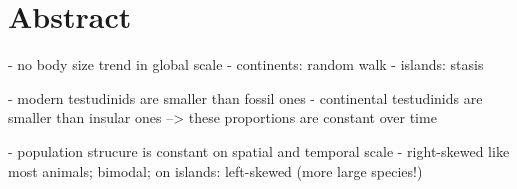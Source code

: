 \section{Abstract}


- no body size trend in global scale
- continents: random walk
- islands: stasis

- modern testudinids are smaller than fossil ones
- continental testudinids are smaller than insular ones
--> these proportions are constant over time

- population strucure is constant on spatial and temporal scale
- right-skewed like most animals; bimodal; on islands: left-skewed (more large species!)